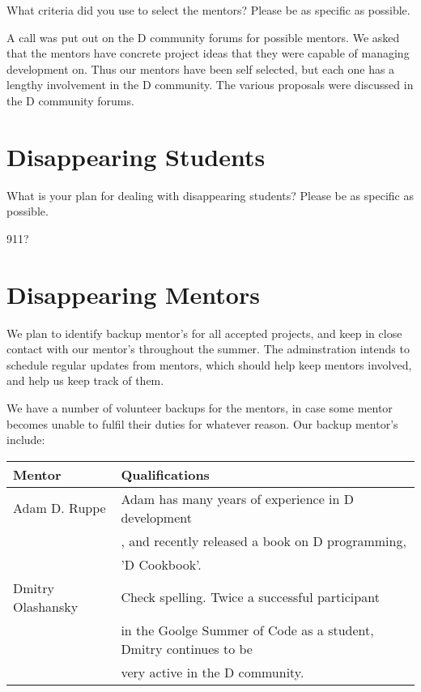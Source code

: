 \documentclass[a4paper,12pt]{article}
\begin{document}
What criteria did you use to select the mentors? 
Please be as specific as possible.

A call was put out on the D community forums for possible mentors.
We asked that the mentors have concrete project ideas that
they were capable of managing development on.  Thus our mentors
have been self selected, but each one has a lengthy involvement 
in the D community. The various proposals were discussed
in the D community forums. 

\section{Disappearing Students}
What is your plan for dealing with disappearing students? 
Please be as specific as possible.

911?

\section{Disappearing Mentors}

We plan to identify backup mentor's for all accepted projects, 
and keep in close contact with our mentor's throughout the
summer.  The adminstration intends to schedule regular updates
from mentors, which should help keep mentors involved, and help
us keep track of them.

We have a number of volunteer backups for the mentors, in case
some mentor becomes unable to fulfil their duties for whatever
reason.  Our backup mentor's include:

\begin{center}
   \begin{tabular}{ | l | l | }
     \hline
     \textbf{Mentor} & \textbf{Qualifications} \\ \hline
     Adam D. Ruppe & Adam has many years of experience in D development\\
     & , and recently released a book on D programming, \\
     & 'D Cookbook'.\\ \hline
     Dmitry Olashansky & Check spelling. Twice a successful participant \\
     & in the Goolge Summer of Code as a student, Dmitry continues to be \\
     & very active in the D community. \\
   \end{tabular}
\end{center}
\end{document}
